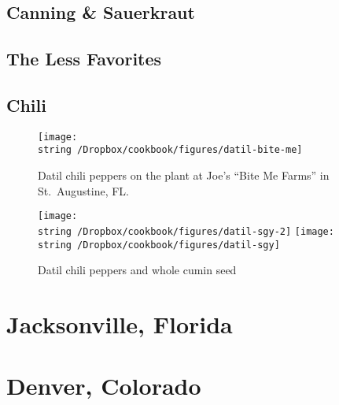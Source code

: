 \documentclass[12pt, final]{book}
\begin{document}
\chapter{Canning \& Sauerkraut}

\newpage

\newpage
\chapter{The Less Favorites}\label{lessfavorites}

\newpage

\newpage

\newpage

\newpage

\newpage

\newpage

\newpage

\newpage

\newpage

\newpage

\chapter{Chili}













\begin{figure}
\begin{center}
\texttt{[image: \\string~/Dropbox/cookbook/figures/datil-bite-me]}
\end{center}
\caption*{Datil chili peppers on the plant at Joe's ``Bite Me Farms'' in St.\ Augustine, FL.}
\end{figure}
\begin{figure}
\begin{center}
\texttt{[image: \\string~/Dropbox/cookbook/figures/datil-sgy-2]}
\texttt{[image: \\string~/Dropbox/cookbook/figures/datil-sgy]}
\end{center}
\caption*{Datil chili peppers and whole cumin seed}
\end{figure}
\part{Jacksonville, Florida}
\part{Denver, Colorado}
\end{document}
